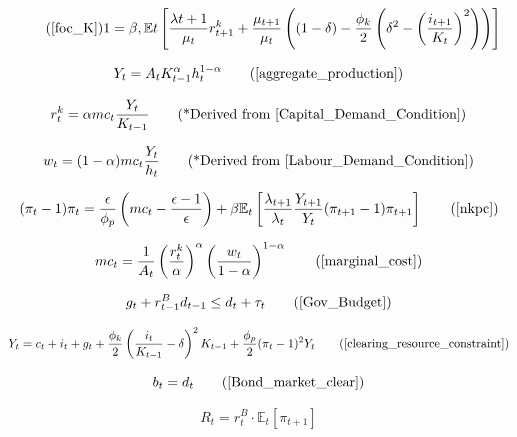 \documentclass[11pt,preprint]{elsarticle}
\numberwithin{equation}{section}
\numberwithin{figure}{section}
\numberwithin{table}{section}
\begin{document}
\begin{equation}\tag{\ref{foc_K}}
1 = \beta , \mathbb{E}t \left[ \frac{\lambda{t+1}}{\mu_t} r^k_{t+1} + \frac{\mu_{t+1}}{\mu_t} \left( (1-\delta) - \frac{\phi_k}{2} \left( \delta^2 - \left( \frac{i_{t+1}}{K_t} \right)^2 \right) \right) \right]
\end{equation}

\begin{equation}
Y_t = A_t K_{t-1}^{\alpha} h_t^{1-\alpha}  \tag{\ref{aggregate_production}}
\end{equation}

\begin{equation}
r_t^k = \alpha  mc_t  \frac{Y_t}{K_{t-1}}  \tag{*Derived from \eqref{Capital_Demand_Condition}}
\end{equation}

\begin{equation}
w_t = (1-\alpha)  mc_t  \frac{Y_t}{h_t}  \tag{*Derived from \eqref{Labour_Demand_Condition}}
\end{equation}

\begin{equation}
(\pi_t - 1)\pi_t = \frac{\epsilon}{\phi_p} \left( mc_t - \frac{\epsilon-1}{\epsilon} \right) + \beta \mathbb{E}_t \left[ \frac{\lambda_{t+1}}{\lambda_t} \frac{Y_{t+1}}{Y_t} (\pi_{t+1} - 1)\pi_{t+1} \right]  \tag{\ref{nkpc}}
\end{equation}

\begin{equation}
mc_t = \frac{1}{A_t} \left( \frac{r_t^k}{\alpha} \right)^{\alpha} \left( \frac{w_t}{1-\alpha} \right)^{1-\alpha}  \tag{\ref{marginal_cost}}
\end{equation}

\begin{equation}
g_t + r^B_{t-1} d_{t-1} \leq d_t + \tau_t \tag{\ref{Gov_Budget}}
\end{equation}

\begin{equation}
   Y_t = c_t + i_t + g_t + \frac{\phi_k}{2} \left( \frac{i_t}{K_{t-1}} - \delta \right)^2 K_{t-1} + \frac{\phi_p}{2} (\pi_t - 1)^2 Y_t
   \tag{\ref{clearing_resource_constraint}}
\end{equation}

\begin{equation}
b_t = d_t
\tag{\ref{Bond_market_clear}}
\end{equation}

\begin{equation}
R_t = r^B_t \cdot \mathbb{E}_t[\pi_{t+1}]  
\end{equation}
\end{document}
